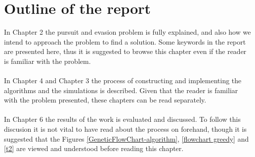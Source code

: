\section{Outline of the report}
In Chapter 2 the pursuit and evasion problem is fully explained, and also how we intend to approach the problem to find a solution. Some keywords in the report are presented here, thus it is suggested to browse this chapter even if the reader is familiar with the problem.\\
\\In Chapter 4 and Chapter 3 the process of constructing and implementing the algorithms and the simulations is described. Given that the reader is familiar with the problem presented, these chapters can be read separately.\\
\\In Chapter 6 the results of the work is evaluated and discussed. To follow this discusion it is not vital to have read about the process on forehand, though it is suggested that the Figures \ref{GeneticFlowChart-algorithm}, \ref{flowchart greedy} and \ref{t2} are viewed and understood before reading this chapter.




